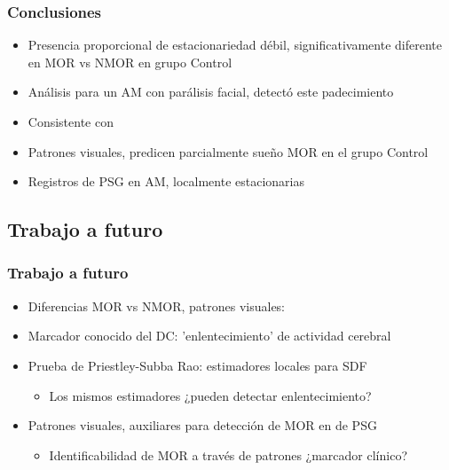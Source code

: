 \documentclass{beamer}
\begin{document}
\begin{frame}\frametitle{Conclusiones}
\begin{itemize}
\item Presencia proporcional de estacionariedad d\'ebil, significativamente diferente en MOR vs 
NMOR en grupo Control

\item An\'alisis para un AM con par\'alisis facial, detect\'o este padecimiento

\item Consistente con %

\item Patrones visuales, predicen parcialmente sue\~no MOR en el grupo Control

\item Registros de PSG en AM, localmente estacionarias
\end{itemize}
\end{frame}


\subsection{Trabajo a futuro}

\begin{frame}\frametitle{Trabajo a futuro}
\begin{itemize}
\item Diferencias MOR vs NMOR, patrones visuales: 

\item Marcador conocido %
del DC: 'enlentecimiento' de actividad cerebral

\item Prueba de Priestley-Subba Rao: estimadores locales para SDF
\begin{itemize}
\item  Los mismos estimadores ¿pueden detectar enlentecimiento?
\end{itemize}

\item Patrones visuales, auxiliares para detecci\'on de MOR en de PSG
\begin{itemize}
\item Identificabilidad de MOR a trav\'es de patrones ¿marcador cl\'inico?
\end{itemize}
\end{itemize}
\end{frame}
\end{document}
